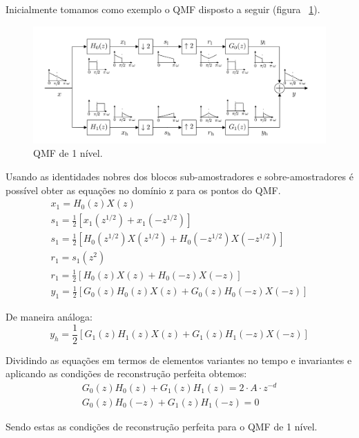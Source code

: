 \documentclass{article}
\begin{document}
Inicialmente tomamos como exemplo o QMF disposto a seguir (figura ~\ref{fig:qmf}).
\begin{figure}[H]
	\begin{center}
		\includegraphics[scale=0.25]{Figures/qmf.png}
		\caption{QMF de 1 nível.}
		\label{fig:qmf}
	\end{center}
\end{figure}
Usando as identidades nobres dos blocos sub-amostradores e sobre-amostradores é possível obter as equações no domínio z para os pontos do QMF.
\begin{equation}
\begin{split}
x_1 = H_0(z)X(z) \\
s_1 = \frac{1}{2}[x_1(z^{1/2}) + x_1(-z^{1/2})] \\
s_1 = \frac{1}{2}[H_0(z^{1/2})X(z^{1/2}) + H_0(-z^{1/2})X(-z^{1/2})] \\
r_1 = s_1(z^2) \\
r_1 = \frac{1}{2}[H_0(z)X(z) + H_0(-z)X(-z)] \\
y_1 = \frac{1}{2} [G_0(z)H_0(z)X(z) + G_0(z)H_0(-z)X(-z)]
\end{split}
\end{equation}

De maneira análoga:
\begin{equation}
y_h = \frac{1}{2} [G_1(z)H_1(z)X(z) + G_1(z)H_1(-z)X(-z)]
\end{equation}

Dividindo as equações em termos de elementos variantes no tempo e invariantes e aplicando as condições de reconstrução perfeita obtemos:
\begin{equation}
\begin{split}
G_0(z)H_0(z) + G_1(z)H_1(z) = 2 \cdot A \cdot z^{-d} \\
G_0(z)H_0(-z) + G_1(z)H_1(-z) = 0
\end{split}
\end{equation}

Sendo estas as condições de reconstrução perfeita para o QMF de 1 nível.
\end{document}
